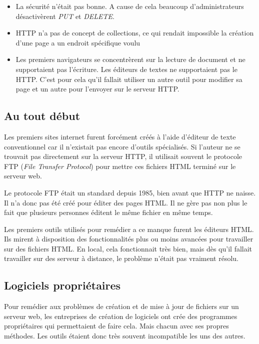 \documentclass[a4paper, 11pt]{article}
\begin{document}
{	\begin{itemize}
		\item 	La sécurité n'était pas bonne. A cause de cela beaucoup d'administrateurs désactivèrent \emph{PUT} et \emph{DELETE}.
		\item 	HTTP n'a pas de concept de collections, ce qui rendait impossible la création d'une page a un endroit spécifique voulu
		\item 	Les premiers navigateurs se concentrèrent sur la lecture de document et ne supportaient pas l'écriture. Les éditeurs de textes ne supportaient pas le HTTP. C'est pour cela qu'il fallait utiliser un autre outil pour modifier sa page et un autre pour l'envoyer sur le serveur HTTP.
	\end{itemize}
			
	\subsection{Au tout début}
	
		Les premiers sites internet furent forcément créés à l'aide d'éditeur de texte conventionnel car il n'existait pas encore d'outils spécialisés. Si l'auteur ne se trouvait pas directement sur la serveur HTTP, il utilisait souvent le protocole FTP (\emph{File Transfer Protocol}) pour mettre ces fichiers HTML terminé sur le serveur web. 

		Le protocole FTP était un standard depuis 1985, bien avant que HTTP ne naisse. Il n'a donc pas été créé pour éditer des pages HTML. Il ne gère pas non plus le fait que plusieurs personnes éditent le même fichier en même temps. 

		Les premiers outils utilisés pour remédier a ce manque furent les éditeurs HTML. Ils mirent à disposition des fonctionnalités plus ou moins avancées pour travailler sur des fichiers HTML. En local, cela fonctionnait très bien, mais dès qu'il fallait travailler sur des serveur à distance, le problème n'était pas vraiment résolu.

	\subsection{Logiciels propriétaires}
	
		Pour remédier aux problèmes de création et de mise à jour de fichiers sur un serveur web, les entreprises de création de logiciels ont crée des programmes propriétaires qui permettaient de faire cela. Mais chacun avec ses propres méthodes. Les outils étaient donc très souvent incompatible les uns des autres. 
		
}
\end{document}
